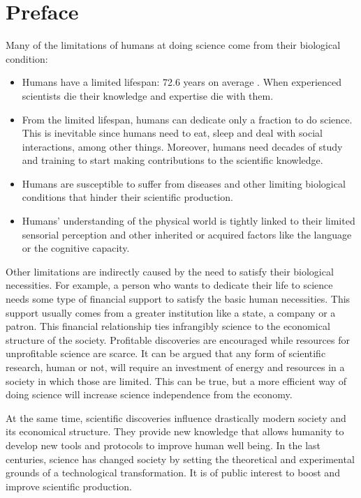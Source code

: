 \documentclass[11pt,a4paper,twoside]{report}
\newcommand{\+}{\textnormal{+} }
\theoremstyle{definition}
\numberwithin{equation}{chapter}
\begin{document}
\chapter{Preface} 

Many of the limitations of humans at doing science come from their biological
condition:
    \begin{itemize}
        \item  Humans have a limited lifespan: 72.6 years on average
        \cite{owidlifeexpectancy}. When experienced scientists die their
        knowledge and expertise die with them.
        \item From the limited lifespan, humans can dedicate only a fraction to
        do science. This is inevitable since humans need to eat, sleep and deal
        with social interactions, among other things. Moreover, humans need
        decades of study and training to start making contributions to the
        scientific knowledge.
        \item Humans are susceptible to suffer from diseases and other limiting
        biological conditions that hinder their scientific production.
        \item Humans' understanding of the physical world is tightly linked to
        their limited sensorial perception and other inherited or acquired
        factors like the language or the cognitive capacity.
    \end{itemize}
    
Other limitations are indirectly caused by the need to satisfy their biological
necessities. For example, a person who wants to dedicate their life to science
needs some type of financial support to satisfy the basic human necessities.
This support usually comes from a greater institution like a state, a company or
a patron. This financial relationship ties infrangibly science to the economical
structure of the society. Profitable discoveries are encouraged while resources
for unprofitable science are scarce. It can be argued that any form of
scientific research, human or not, will require an investment of energy and
resources in a society in which those are limited. This can be true, but a more
efficient way of doing science will increase science independence from the
economy. 

At the same time, scientific discoveries influence drastically modern society
and its economical structure. They provide new knowledge that allows humanity to
develop new tools and protocols to improve human well being. In the last
centuries, science has changed society by setting the theoretical and
experimental grounds of a technological transformation. It is of public interest
to boost and improve scientific production.
\end{document}
